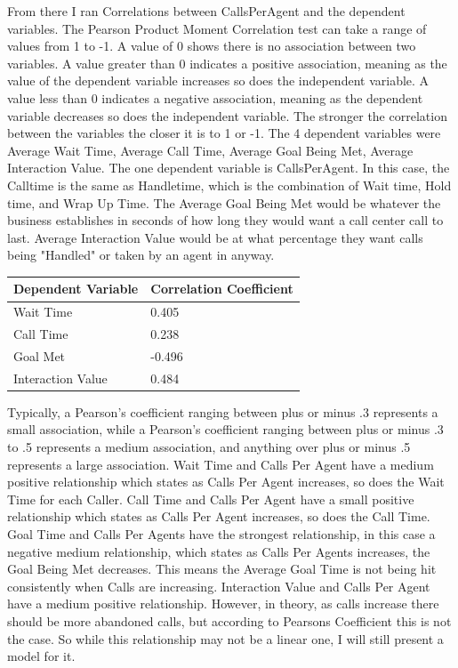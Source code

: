 \documentclass[12pt]{article}
\begin{document}
  From there I ran Correlations between CallsPerAgent and the dependent variables. The Pearson Product Moment Correlation test can take a range of values from 1 to -1. A value of 0 shows there is no association between two variables. 
A value greater than 0 indicates a positive association, meaning as the value of the dependent variable increases so does the independent variable. A value less than 0 indicates a negative association, meaning as the dependent 
variable decreases so does the independent variable. The stronger the correlation between the variables the closer it is to 1 or -1.  The 4 dependent variables were Average Wait Time, Average Call Time, Average Goal Being Met, Average Interaction Value. 
The one dependent variable is CallsPerAgent. In this case, the Calltime is the same as Handletime, which is the combination of Wait time, Hold time, and Wrap Up Time. 
The Average Goal Being Met would be whatever the business establishes in seconds of  how long they would want a call center call to last. Average Interaction Value would be at what percentage 
they want calls being "Handled" or taken by an agent in anyway. 
\begin{table}[H]
  \resizebox{\textwidth}{!} {
  \begin{tabular}{ l | l |}
    {\bf Dependent Variable} & {\bf Correlation Coefficient}\\
  \hline
  Wait Time& 0.405 \\
  \hline
  Call Time& 0.238\\
  \hline
  Goal Met& -0.496  \\
  \hline
  Interaction Value& 0.484\\
  \end{tabular}
  }
  \end{table}
Typically, a Pearson's coefficient ranging between plus or minus .3 represents a small association, while a Pearson's coefficient
ranging between plus or minus .3 to .5 represents a medium association, and anything over plus or minus .5 represents a large association.
Wait Time and Calls Per Agent have a medium positive relationship which states as Calls Per Agent increases, so does the Wait Time for 
each Caller. Call Time and Calls Per Agent have a small positive relationship which states as Calls Per Agent increases, so does the 
Call Time. Goal Time and Calls Per Agents have the strongest relationship, in this case a negative medium relationship, which states as
Calls Per Agents increases, the Goal Being Met decreases. This means the Average Goal Time is not being hit consistently when Calls 
are increasing. Interaction Value and Calls Per Agent have a medium positive relationship. However, in theory, as calls increase there should
be more abandoned calls, but according to Pearsons Coefficient this is not the case. So while this relationship may not be a linear one,
I will still present a model for it.
  
\end{document}
